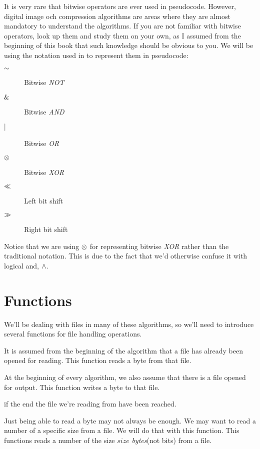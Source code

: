 It is very rare that bitwise operators are ever used in
pseudocode. However, digital image och compression algorithms are
areas where they are almost mandatory to understand the algorithms. If
you are not familiar with bitwise operators, look up them and study
them on your own, as I assumed from the beginning of this book that such
knowledge should be obvious to you. We will be using the notation used
in \C{} to represent them in pseudocode:

\begin{description}
\item[$\mathord{\sim}$] Bitwise \textit{NOT}
\item[$\mathrel{\&}$] Bitwise \textit{AND}
\item[$\mathrel{|}$] Bitwise \textit{OR}
\item[$\mathrel{\otimes}$] Bitwise \textit{XOR}
\item[$\ll$] Left bit shift
\item[$\gg$] Right bit shift
\end{description}

Notice that we are using $\mathrel{\otimes}$ for representing bitwise
\textit{XOR} rather than the traditional \C{} notation. This is due to
the fact that we'd otherwise confuse it with logical and, $\wedge$.

\section{Functions}
\label{sec:pseudocode}

We'll be dealing with files in many of these algorithms, so we'll need
to introduce several functions for file handling operations.

\begin{description}[font=\normalfont]
\item[\textproc{ReadByte}] It is assumed from the beginning of the
  algorithm that a file has already been opened for reading. This
  function reads a byte from that file.

\item[\Call{WriteByte}{$byte$}] At the beginning of every algorithm,
  we also assume that there is a file opened for output. This function
  writes a byte to that file.

\item[\textproc{EndOfFileReached}] \True{} if the end the file we're
  reading from have been reached.

\item[\Call{Read}{$size$}] Just being able to read a byte may not
  always be enough. We may want to read a number of a specific size
  from a file. We will do that with this function. This functions
  reads a number of the size $size$ \textit{bytes}(not bits) from a
  file.


\end{description}

